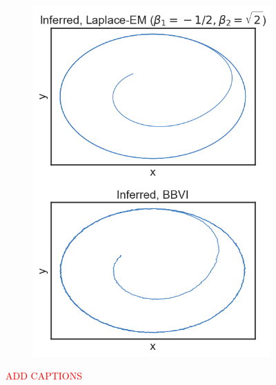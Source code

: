 \begin{figure}
\begin{subfigure}[b]{0.33\linewidth}
        \includegraphics[width=\linewidth]{./Figures/bautin-lpc.png}
        \caption{}
        \label{bautinresults:c}
        \vspace{4ex}
    \end{subfigure}
    \caption{\textcolor{red}{ADD CAPTIONS}}
    \label{bautinresults}
\end{figure}